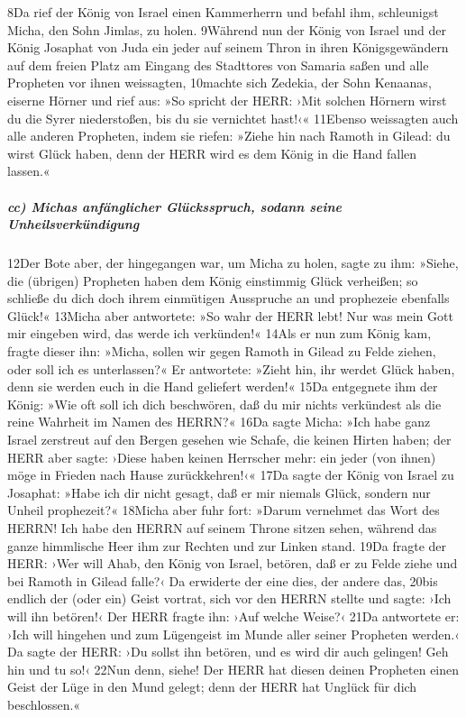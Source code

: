 8Da rief der König von Israel einen Kammerherrn und befahl ihm,
schleunigst Micha, den Sohn Jimlas, zu holen. 9Während nun der König von
Israel und der König Josaphat von Juda ein jeder auf seinem Thron in
ihren Königsgewändern auf dem freien Platz am Eingang des Stadttores von
Samaria saßen und alle Propheten vor ihnen weissagten, 10machte sich
Zedekia, der Sohn Kenaanas, eiserne Hörner und rief aus: »So spricht der
HERR: ›Mit solchen Hörnern wirst du die Syrer niederstoßen, bis du sie
vernichtet hast!‹« 11Ebenso weissagten auch alle anderen Propheten,
indem sie riefen: »Ziehe hin nach Ramoth in Gilead: du wirst Glück
haben, denn der HERR wird es dem König in die Hand fallen lassen.«

\hypertarget{cc-michas-anfuxe4nglicher-gluxfccksspruch-sodann-seine-unheilsverkuxfcndigung}{%
\subparagraph{cc) Michas anfänglicher Glücksspruch, sodann seine
Unheilsverkündigung}\label{cc-michas-anfuxe4nglicher-gluxfccksspruch-sodann-seine-unheilsverkuxfcndigung}}

12Der Bote aber, der hingegangen war, um Micha zu holen, sagte zu ihm:
»Siehe, die (übrigen) Propheten haben dem König einstimmig Glück
verheißen; so schließe du dich doch ihrem einmütigen Ausspruche an und
prophezeie ebenfalls Glück!« 13Micha aber antwortete: »So wahr der HERR
lebt! Nur was mein Gott mir eingeben wird, das werde ich verkünden!«
14Als er nun zum König kam, fragte dieser ihn: »Micha, sollen wir gegen
Ramoth in Gilead zu Felde ziehen, oder soll ich es unterlassen?« Er
antwortete: »Zieht hin, ihr werdet Glück haben, denn sie werden euch in
die Hand geliefert werden!« 15Da entgegnete ihm der König: »Wie oft soll
ich dich beschwören, daß du mir nichts verkündest als die reine Wahrheit
im Namen des HERRN?« 16Da sagte Micha: »Ich habe ganz Israel zerstreut
auf den Bergen gesehen wie Schafe, die keinen Hirten haben; der HERR
aber sagte: ›Diese haben keinen Herrscher mehr: ein jeder (von ihnen)
möge in Frieden nach Hause zurückkehren!‹« 17Da sagte der König von
Israel zu Josaphat: »Habe ich dir nicht gesagt, daß er mir niemals
Glück, sondern nur Unheil prophezeit?« 18Micha aber fuhr fort: »Darum
vernehmet das Wort des HERRN! Ich habe den HERRN auf seinem Throne
sitzen sehen, während das ganze himmlische Heer ihm zur Rechten und zur
Linken stand. 19Da fragte der HERR: ›Wer will Ahab, den König von
Israel, betören, daß er zu Felde ziehe und bei Ramoth in Gilead falle?‹
Da erwiderte der eine dies, der andere das, 20bis endlich der (oder ein)
Geist vortrat, sich vor den HERRN stellte und sagte: ›Ich will ihn
betören!‹ Der HERR fragte ihn: ›Auf welche Weise?‹ 21Da antwortete er:
›Ich will hingehen und zum Lügengeist im Munde aller seiner Propheten
werden.‹ Da sagte der HERR: ›Du sollst ihn betören, und es wird dir auch
gelingen! Geh hin und tu so!‹ 22Nun denn, siehe! Der HERR hat diesen
deinen Propheten einen Geist der Lüge in den Mund gelegt; denn der HERR
hat Unglück für dich beschlossen.«

